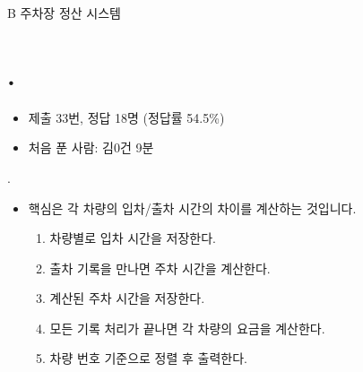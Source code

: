 
\setproblem
    {B}
    {주차장 정산 시스템}

\section{\pletter. \ptitle}

\begin{frame}[label=problem-B] %
    \sectiontitle{\pletter}{\ptitle}
    \begin{itemize}
        \item 제출 33번, 정답 18명 (정답률 54.5\%)
        \item 처음 푼 사람: 김0건 9분
    \end{itemize}
\end{frame}
\begin{frame}{\textbf{\pletter}. \ptitle}
    \begin{itemize}
        \item 핵심은 각 차량의 입차/출차 시간의 차이를 계산하는 것입니다.
        \begin{enumerate}
            \item 차량별로 입차 시간을 저장한다. 
            \item 출차 기록을 만나면 주차 시간을 계산한다.
            \item 계산된 주차 시간을 저장한다.
            \item 모든 기록 처리가 끝나면 각 차량의 요금을 계산한다.
            \item 차량 번호 기준으로 정렬 후 출력한다.
        \end{enumerate}
    \end{itemize}
\end{frame}
